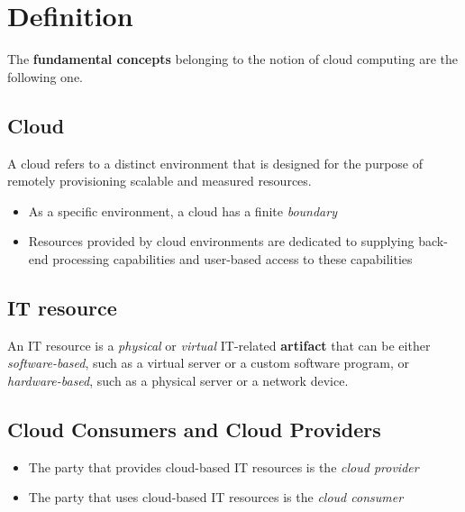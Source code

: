 \section{Definition}
The \textbf{fundamental concepts} belonging to the notion of cloud computing are the following one.
\subsection{Cloud}
A cloud refers to a distinct environment that is designed for the purpose of remotely provisioning scalable and measured resources.
\begin{itemize}
    \item As a specific environment, a cloud has a finite \textit{boundary}
    \item Resources provided by cloud environments are dedicated to supplying back-end processing capabilities and user-based access to these capabilities
\end{itemize}

\subsection{IT resource}
An IT resource is a \textit{physical} or \textit{virtual} IT-related \textbf{artifact} that can be either \textit{software-based}, such as a virtual server or a custom software program, or \textit{hardware-based}, such as a physical server or a network device.

\subsection{Cloud Consumers and Cloud Providers}
\begin{itemize}
    \item The party that provides cloud-based IT resources is the \textit{cloud provider}
    \item The party that uses cloud-based IT resources is the \textit{cloud consumer}
\end{itemize}


